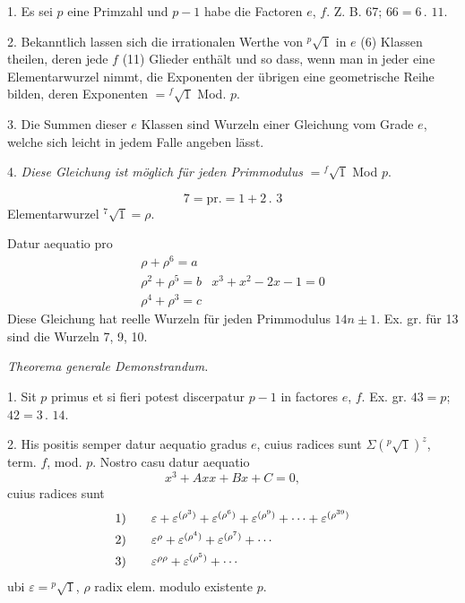 \NoSourceHead
{}
\noindent\hspace*{\parindent}1. Es sei $p$ eine Primzahl und $p-1$ habe die Factoren $e$, $f$.
Z. B. 67; $66=6\mathpunct{.}\,11$.

2. Bekanntlich lassen sich die irrationalen Werthe von ${}^p\!\surd1$ in $e$ (6) Klassen
theilen, deren jede $f$ (11) Glieder enthält und so dass, wenn man in jeder eine Elementarwurzel
nimmt, die Exponenten der übrigen eine geometrische Reihe bilden, deren Exponenten
$={}^f\!\surd1$ Mod. $p$.

3. Die Summen dieser $e$ Klassen sind Wurzeln einer Gleichung vom Grade $e$, welche sich
leicht in jedem Falle angeben lässt.

4. \textit{Diese Gleichung ist möglich für jeden Primmodulus} $={}^f\!\surd1$ Mod $p$.
\par\noindent\hspace*{\parindent}
\[7=\text{pr.}=1+2\mathpunct{.}\,3\]
\noindent Elementarwurzel ${}^7\!\surd1=\rho$.
\par\noindent\hspace*{\parindent}Datur aequatio pro
\[
\begin{array}{ll}
\rho+\rho^6=a&\\
\rho^2+\rho^5=b&x^3+x^2-2x-1=0\\
\rho^4+\rho^3=c&
\end{array}
\]
\noindent Diese Gleichung hat reelle Wurzeln für jeden Primmodulus $14n\pm1$.
Ex. gr. für 13 sind die Wurzeln 7, 9, 10.
\ClosingRule
\clearpage
{}
\begin{center}\textit{Theorema generale Demonstrandum.}\end{center}
\noindent\hspace*{\parindent}1. Sit $p$ primus et si fieri potest discerpatur $p-1$ in factores $e$, $f$.
Ex. gr. $43=p$; $42=3\mathpunct{.}\,14$.

2. His positis semper datur aequatio gradus $e$, cuius radices sunt $\Sigma({}^p\!\surd1)^z$,
term. $f$, mod. $p$. Nostro casu datur aequatio
\[x^3+Axx+Bx+C=0,\]
\noindent cuius radices sunt
\[
\begin{array}{r@{\qquad}l}
1)&\varepsilon+\varepsilon^{(\rho^3)}+\varepsilon^{(\rho^6)}+\varepsilon^{(\rho^9)}+\cdots+\varepsilon^{(\rho^{39})}\\[4pt]
2)&\varepsilon^\rho+\varepsilon^{(\rho^4)}+\varepsilon^{(\rho^7)}+\cdots\\[4pt]
3)&\varepsilon^{\rho\rho}+\varepsilon^{(\rho^5)}+\cdots
\end{array}
\]
\noindent ubi $\varepsilon={}^p\!\surd1$, $\rho$ radix elem. modulo existente $p$.

